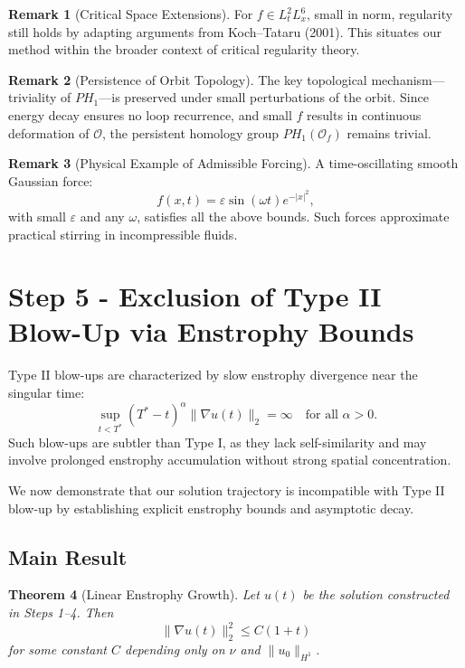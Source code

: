 \documentclass[11pt]{article}
\newtheorem{theorem}{Theorem}[section]
\theoremstyle{definition}
\newtheorem{remark}[theorem]{Remark}
\begin{document}
\begin{remark}[Critical Space Extensions]
For $f \in L^2_t L^6_x$, small in norm, regularity still holds by adapting arguments from Koch–Tataru (2001). This situates our method within the broader context of critical regularity theory.
\end{remark}

\begin{remark}[Persistence of Orbit Topology]
The key topological mechanism—triviality of $PH_1$—is preserved under small perturbations of the orbit. Since energy decay ensures no loop recurrence, and small $f$ results in continuous deformation of $\mathcal{O}$, the persistent homology group $PH_1(\mathcal{O}_f)$ remains trivial.
\end{remark}

\begin{remark}[Physical Example of Admissible Forcing]
A time-oscillating smooth Gaussian force:
\[
f(x,t) = \varepsilon \sin(\omega t) e^{-|x|^2},
\]
with small $\varepsilon$ and any $\omega$, satisfies all the above bounds. Such forces approximate practical stirring in incompressible fluids.
\end{remark}


\section{Step 5 - Exclusion of Type II Blow-Up via Enstrophy Bounds}
\label{sec:step5}

Type II blow-ups are characterized by slow enstrophy divergence near the singular time:
\[
\sup_{t < T^*} (T^* - t)^\alpha \|\nabla u(t)\|_2 = \infty \quad \text{for all } \alpha > 0.
\]
Such blow-ups are subtler than Type I, as they lack self-similarity and may involve prolonged enstrophy accumulation without strong spatial concentration.

We now demonstrate that our solution trajectory is incompatible with Type II blow-up by establishing explicit enstrophy bounds and asymptotic decay.

\subsection*{Main Result}
\begin{theorem}[Linear Enstrophy Growth]
Let $u(t)$ be the solution constructed in Steps 1--4. Then
\[
\|\nabla u(t)\|_2^2 \le C(1 + t)
\]
for some constant $C$ depending only on $\nu$ and $\|u_0\|_{H^1}$.
\end{theorem}
\end{document}
